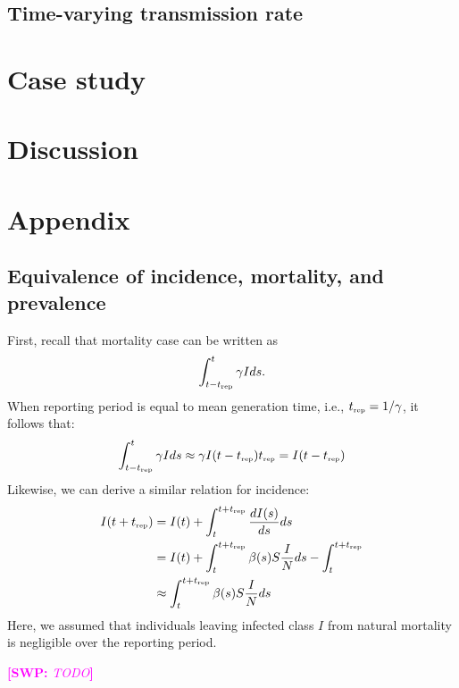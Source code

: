 \documentclass{article}
\newcommand{\comment}[3]{\textcolor{#1}{\textbf{[#2: }\textsl{#3}\textbf{]}}}
\newcommand{\swp}[1]{\comment{magenta}{SWP}{#1}}
\newcommand{\tsub}[2]{#1_{{\textrm{\tiny #2}}}}
\begin{document}
\subsection{Time-varying transmission rate}

\pagebreak

\section{Case study}

\section{Discussion}

\pagebreak

\section{Appendix}

\subsection{Equivalence of incidence, mortality, and prevalence}

First, recall that mortality case can be written as
\begin{equation}
\int_{t-\tsub{t}{rep}}^{t} \gamma I ds.
\end{equation}
When reporting period is equal to mean generation time, i.e., $\tsub{t}{rep} = 1/\gamma$, 
it follows that:
\begin{equation}
\int_{t-\tsub{t}{rep}}^{t} \gamma I ds \approx \gamma I(t-\tsub{t}{rep}) \tsub{t}{rep} = I(t-\tsub{t}{rep})
\end{equation}
Likewise, we can derive a similar relation for incidence:
\begin{equation}
\begin{aligned}
I(t+\tsub{t}{rep}) &= I(t) + \int_{t}^{t+\tsub{t}{rep}} \frac{dI(s)}{ds} ds\\
&= I(t) + \int_{t}^{t+\tsub{t}{rep}} \beta(s) S \frac{I}{N} ds - \int_{t}^{t+\tsub{t}{rep}}\\
&\approx \int_{t}^{t+\tsub{t}{rep}} \beta(s) S \frac{I}{N} ds
\end{aligned}
\end{equation}
Here, we assumed that individuals leaving infected class $I$ from natural mortality is negligible over the reporting period.

\swp{TODO}
\end{document}
